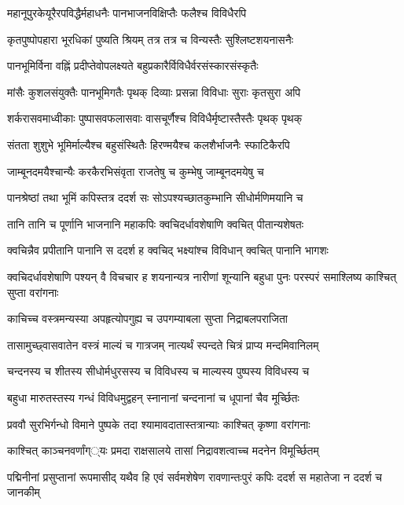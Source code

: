 \twolineshloka
{महानूपुरकेयूरैरपविद्धैर्महाधनैः}
{पानभाजनविक्षिप्तैः फलैश्च विविधैरपि} %

\twolineshloka
{कृतपुष्पोपहारा भूरधिकां पुष्यति श्रियम्}
{तत्र तत्र च विन्यस्तैः सुश्लिष्टशयनासनैः} %

\twolineshloka
{पानभूमिर्विना वह्निं प्रदीप्तेवोपलक्ष्यते}
{बहुप्रकारैर्विविधैर्वरसंस्कारसंस्कृतैः} %

\twolineshloka
{मांसैः कुशलसंयुक्तैः पानभूमिगतैः पृथक्}
{दिव्याः प्रसन्ना विविधाः सुराः कृतसुरा अपि} %

\twolineshloka
{शर्करासवमाध्वीकाः पुष्पासवफलासवाः}
{वासचूर्णैश्च विविधैर्मृष्टास्तैस्तैः पृथक् पृथक्} %

\twolineshloka
{संतता शुशुभे भूमिर्माल्यैश्च बहुसंस्थितैः}
{हिरण्मयैश्च कलशैर्भाजनैः स्फाटिकैरपि} %

\twolineshloka
{जाम्बूनदमयैश्चान्यैः करकैरभिसंवृता}
{राजतेषु च कुम्भेषु जाम्बूनदमयेषु च} %

\twolineshloka
{पानश्रेष्ठां तथा भूमिं कपिस्तत्र ददर्श सः}
{सोऽपश्यच्छातकुम्भानि सीधोर्मणिमयानि च} %

\twolineshloka
{तानि तानि च पूर्णानि भाजनानि महाकपिः}
{क्वचिदर्धावशेषाणि क्वचित् पीतान्यशेषतः} %

\twolineshloka
{क्वचिन्नैव प्रपीतानि पानानि स ददर्श ह}
{क्वचिद् भक्ष्यांश्च विविधान् क्वचित् पानानि भागशः} %

\threelineshloka
{क्वचिदर्धावशेषाणि पश्यन् वै विचचार ह}
{शयनान्यत्र नारीणां शून्यानि बहुधा पुनः}
{परस्परं समाश्लिष्य काश्चित् सुप्ता वरांगनाः} %

\twolineshloka
{काचिच्च वस्त्रमन्यस्या अपहृत्योपगुह्य च}
{उपगम्याबला सुप्ता निद्राबलपराजिता} %

\twolineshloka
{तासामुच्छ्वासवातेन वस्त्रं माल्यं च गात्रजम्}
{नात्यर्थं स्पन्दते चित्रं प्राप्य मन्दमिवानिलम्} %

\twolineshloka
{चन्दनस्य च शीतस्य सीधोर्मधुरसस्य च}
{विविधस्य च माल्यस्य पुष्पस्य विविधस्य च} %

\twolineshloka
{बहुधा मारुतस्तस्य गन्धं विविधमुद्वहन्}
{स्नानानां चन्दनानां च धूपानां चैव मूर्च्छितः} %

\twolineshloka
{प्रववौ सुरभिर्गन्धो विमाने पुष्पके तदा}
{श्यामावदातास्तत्रान्याः काश्चित् कृष्णा वरांगनाः} %

\twolineshloka
{काश्चित् काञ्चनवर्णांग््यः प्रमदा राक्षसालये}
{तासां निद्रावशत्वाच्च मदनेन विमूर्च्छितम्} %

\threelineshloka
{पद्मिनीनां प्रसुप्तानां रूपमासीद् यथैव हि}
{एवं सर्वमशेषेण रावणान्तःपुरं कपिः}
{ददर्श स महातेजा न ददर्श च जानकीम्} %

